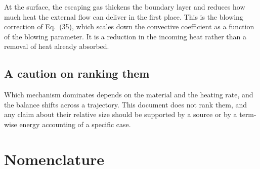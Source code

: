 \documentclass[11pt]{article}
\begin{document}
At the surface, the escaping gas thickens the boundary layer and reduces how much
heat the external flow can deliver in the first place. This is the blowing
correction of Eq.~(35), which scales down the convective coefficient as a
function of the blowing parameter. It is a reduction in the incoming heat rather
than a removal of heat already absorbed.

\subsection*{A caution on ranking them}

Which mechanism dominates depends on the material and the heating rate, and the
balance shifts across a trajectory. This document does not rank them, and any
claim about their relative size should be supported by a source or by a term-wise
energy accounting of a specific case.

\clearpage
\section{Nomenclature}
\end{document}
